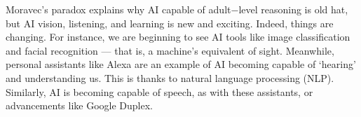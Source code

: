 \documentclass[12pt]{article}
\begin{document}
Moravec’s paradox explains why AI capable of adult$-$level reasoning is old hat, but AI vision, listening, and learning is new and exciting. Indeed, things are changing. For instance, we are beginning to see AI tools like image classification and facial recognition — that is, a machine’s equivalent of sight.  Meanwhile, personal assistants like Alexa are an example of AI becoming capable of ‘hearing’ and understanding us. This is thanks to natural language processing (NLP). Similarly, AI is becoming capable of speech, as with these assistants, or advancements like Google Duplex.
\end{document}

